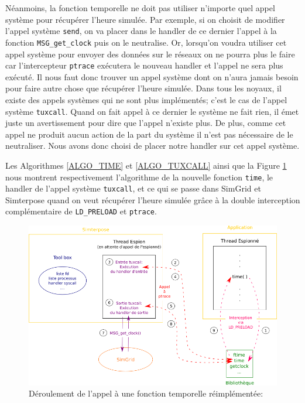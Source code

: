 Néanmoins, la fonction temporelle ne doit pas utiliser n'importe quel appel système pour récupérer l'heure simulée. Par exemple, si on choisit de modifier l'appel système \texttt{send}, on va placer dans le handler de ce dernier l'appel à la fonction \texttt{MSG\_get\_clock} puis on le neutralise. Or, lorsqu'on voudra utiliser cet appel système pour envoyer des données sur le réseaux on ne pourra plus le faire car l'intercepteur \texttt{ptrace} exécutera le nouveau handler et l'appel ne sera plus exécuté. Il nous faut donc trouver un appel système dont on n'aura jamais besoin pour faire autre chose que récupérer l'heure simulée. Dans tous les noyaux, il existe des appels systèmes qui ne sont plus implémentés; c'est le cas de l'appel système \texttt{tuxcall}. Quand on fait appel à ce dernier le système ne fait rien, il émet juste un avertissement pour dire que l'appel n'existe plus. De plus, comme cet appel ne produit aucun action de la part du système il n'est pas nécessaire de le neutraliser. Nous avons donc choisi de placer notre handler sur cet appel système.

Les Algorithmes \ref{ALGO_TIME} et \ref{ALGO_TUXCALL} ainsi que la Figure \ref{time_interception} nous montrent respectivement l'algorithme de la nouvelle fonction \texttt{time}, le handler de l'appel système \texttt{tuxcall}, et ce qui se passe dans SimGrid et Simterpose quand on veut récupérer l'heure simulée grâce à la double interception complémentaire de \texttt{LD\_PRELOAD} et \texttt{ptrace}.

\begin{figure}[H]
  \centering
  \includegraphics[scale=0.7]{Pictures/png/Open_pandor}
  \caption[Déroulement de l'appel à une fonction temporelle réimplémentée]{Déroulement de l'appel à une fonction temporelle réimplémentée:}
  \label{time_interception}
\end{figure}

